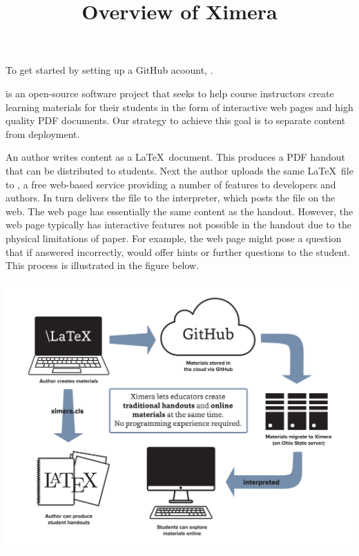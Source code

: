 \documentclass{ximera}
\title{Overview of Ximera}
\begin{document}
\maketitle

\begin{flushright}
To get started by setting up a GitHub acoount, .
\end{flushright}

 is an open-source software project that seeks to help course instructors create learning materials for their students in the form of interactive web pages and high quality PDF documents.
Our strategy to achieve this goal is to separate content from deployment.

An author writes content as a \LaTeX\ document.
This produces a PDF handout that can be distributed to students.
Next the author uploads the same \LaTeX\ file to ,
a free web-based service providing a number of features to developers and authors.
In turn  delivers the file to the  interpreter, which posts the file on the web.
The web page has essentially the same content as the handout.
However, the web page typically has interactive features not possible in the handout due to the physical limitations of paper.
For example, the web page might pose a question that if answered incorrectly, would offer hints or further questions
to the student.
This process is illustrated in the figure below.

\begin{center}
\includegraphics[scale=0.25]{XimeraGraphic.png}
\end{center}
\end{document}
